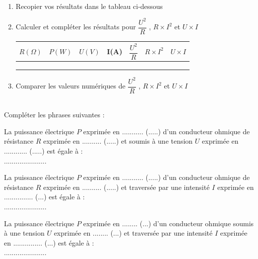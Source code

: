 \documentclass[11pt,a4paper]{article}
\begin{document}
  \\

 \begin{enumerate}[label*=1.\arabic*.]
 \item Recopier vos résultats dans le tableau ci-dessous 

 \item Calculer et compléter les résultats pour $\dfrac{U^2}{R}$ , $R \times I^2$ et $U \times I$ 

 
\begin{center}
    

    \begin{tabular}{|C{1.8cm}|C{1.8cm}|C{1.8cm}|C{1.8cm}||C{1.8cm}||C{1.8cm}||C{1.8cm}|}
         \hline
         $R(\Omega)$ & $P(W)$ &  $U(V)$ & I(A) & $\dfrac{U^2}{R}$ & $R \times I^2$ & $U \times I$ \\

         \hline
           &  &  & & & &  \\
         \hline
          &  &  & & & &  \\
         \hline
          &  &  & & & &  \\
         \hline
 
    \end{tabular}
\end{center}

\item Comparer les valeurs numériques de $\dfrac{U^2}{R}$ , $R \times I^2$ et $U \times I$ 

\vspace{3mm}
\dotfill 


\end{enumerate}


  \\[3mm]

Compléter les phrases suivantes : 
\begin{spacing}{2}
La puissance électrique $P$ exprimée en ........... (.....) d'un conducteur ohmique de résistance $R$ exprimée en .......... (.....) et soumis à une tension $U$ exprimée en ............ (.....) est égale à : \\ \hfill ...................... \hfill ~


La puissance électrique $P$ exprimée en ........... (.....) d'un conducteur ohmique de résistance $R$ exprimée en .......... (.....) et  traversée par une intensité $I$ exprimée en ............... (...) est égale à : \\
\hfill ...................... \hfill ~

La puissance électrique $P$ exprimée en ........ (...) d'un conducteur ohmique soumis à une tension $U$ exprimée en ........ (...) et  traversée par une intensité $I$ exprimée en ............... (...) est égale à : \\
\hfill ...................... \hfill ~
\end{spacing}
\end{document}
